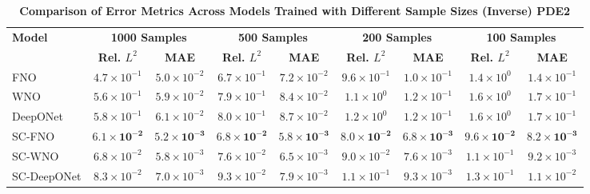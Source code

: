 


\begin{table}[ht!]
\centering
\caption{\scriptsize\textbf{Comparison of Error Metrics Across Models Trained with Different Sample Sizes (Inverse) PDE2}}
\label{tab:pde2_inverse_nostd}
\scriptsize
\setlength{\tabcolsep}{3pt}
\begin{tabular}{lcccccccc}
\hline
\textbf{Model} & \multicolumn{2}{c}{\textbf{1000 Samples}} & \multicolumn{2}{c}{\textbf{500 Samples}} & \multicolumn{2}{c}{\textbf{200 Samples}} & \multicolumn{2}{c}{\textbf{100 Samples}} \\
 & \textbf{Rel. \(L^2\)} & \textbf{MAE} & \textbf{Rel. \(L^2\)} & \textbf{MAE} & \textbf{Rel. \(L^2\)} & \textbf{MAE} & \textbf{Rel. \(L^2\)} & \textbf{MAE} \\
\hline
FNO        & \(4.7 \times 10^{-1}\) & \(5.0 \times 10^{-2}\) & \(6.7 \times 10^{-1}\) & \(7.2 \times 10^{-2}\) & \(9.6 \times 10^{-1}\) & \(1.0 \times 10^{-1}\) & \(1.4 \times 10^{0}\) & \(1.4 \times 10^{-1}\) \\
WNO        & \(5.6 \times 10^{-1}\) & \(5.9 \times 10^{-2}\) & \(7.9 \times 10^{-1}\) & \(8.4 \times 10^{-2}\) & \(1.1 \times 10^{0}\) & \(1.2 \times 10^{-1}\) & \(1.6 \times 10^{0}\) & \(1.7 \times 10^{-1}\) \\
DeepONet   & \(5.8 \times 10^{-1}\) & \(6.1 \times 10^{-2}\) & \(8.0 \times 10^{-1}\) & \(8.7 \times 10^{-2}\) & \(1.2 \times 10^{0}\) & \(1.2 \times 10^{-1}\) & \(1.6 \times 10^{0}\) & \(1.7 \times 10^{-1}\) \\
SC-FNO     & \(\mathbf{6.1 \times 10^{-2}}\) & \(\mathbf{5.2 \times 10^{-3}}\) & \(\mathbf{6.8 \times 10^{-2}}\) & \(\mathbf{5.8 \times 10^{-3}}\) & \(\mathbf{8.0 \times 10^{-2}}\) & \(\mathbf{6.8 \times 10^{-3}}\) & \(\mathbf{9.6 \times 10^{-2}}\) & \(\mathbf{8.2 \times 10^{-3}}\) \\
SC-WNO     & \(6.8 \times 10^{-2}\) & \(5.8 \times 10^{-3}\) & \(7.6 \times 10^{-2}\) & \(6.5 \times 10^{-3}\) & \(9.0 \times 10^{-2}\) & \(7.6 \times 10^{-3}\) & \(1.1 \times 10^{-1}\) & \(9.2 \times 10^{-3}\) \\
SC-DeepONet& \(8.3 \times 10^{-2}\) & \(7.0 \times 10^{-3}\) & \(9.3 \times 10^{-2}\) & \(7.9 \times 10^{-3}\) & \(1.1 \times 10^{-1}\) & \(9.3 \times 10^{-3}\) & \(1.3 \times 10^{-1}\) & \(1.1 \times 10^{-2}\) \\
\hline
\end{tabular}
\end{table}






